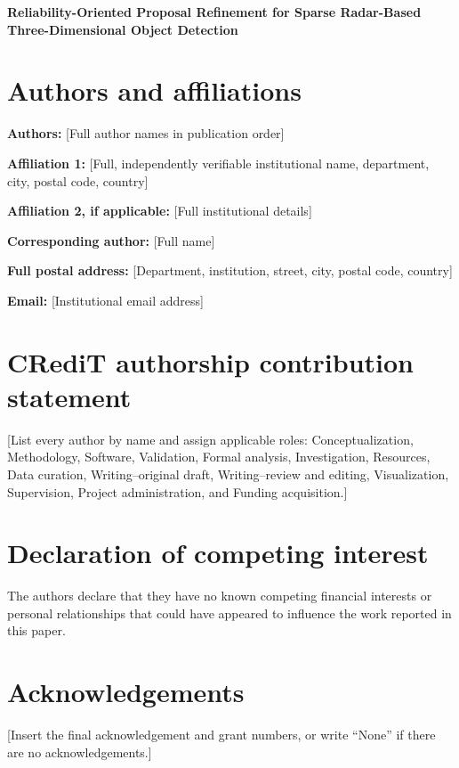 \documentclass[12pt]{article}
\begin{document}
\begin{center}
{\Large\bfseries Reliability-Oriented Proposal Refinement for Sparse
Radar-Based Three-Dimensional Object Detection}
\end{center}

\section*{Authors and affiliations}

\textbf{Authors:} [Full author names in publication order]

\textbf{Affiliation 1:} [Full, independently verifiable institutional name,
department, city, postal code, country]

\textbf{Affiliation 2, if applicable:} [Full institutional details]

\textbf{Corresponding author:} [Full name]

\textbf{Full postal address:} [Department, institution, street, city, postal
code, country]

\textbf{Email:} [Institutional email address]

\section*{CRediT authorship contribution statement}

[List every author by name and assign applicable roles: Conceptualization,
Methodology, Software, Validation, Formal analysis, Investigation, Resources,
Data curation, Writing--original draft, Writing--review and editing,
Visualization, Supervision, Project administration, and Funding acquisition.]

\section*{Declaration of competing interest}

The authors declare that they have no known competing financial interests or
personal relationships that could have appeared to influence the work reported
in this paper.

\section*{Acknowledgements}

[Insert the final acknowledgement and grant numbers, or write ``None'' if
there are no acknowledgements.]
\end{document}
